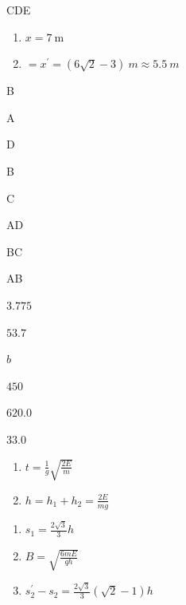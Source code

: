 \item CDE
\item \begin {enumerate} \renewcommand {\labelenumi }{\arabic {enumi}.} \item $x=7 \ \mathrm {m}$ \par \item $=x^{\prime }=(6 \sqrt {2}-3) \ m \approx 5.5 \ m$ \end {enumerate} \par \par 
\item B
\item A
\item D
\item \par 
\item B
\item \par 
\item C
\item \par 
\item AD
\item \par 
\item BC
\item \par 
\item AB
\item \par 
\item $ 3.775 $
\item $ 53.7 $
\item $ b $
\item $ 450 $
\item $ 620.0 $
\item $ 33.0 $
\item \par 
\item \begin {enumerate} \renewcommand {\labelenumi }{\arabic {enumi}.} \item $t=\frac {1}{g} \sqrt {\frac {2 E}{m}}$ \item $h=h_{1}+h_{2}=\frac {2 E}{m g}$ \par \end {enumerate} \par \par 
\item \begin {enumerate} \renewcommand {\labelenumi }{\arabic {enumi}.} \item $s_{1}=\frac {2 \sqrt {3}}{3} h$ \item $B=\sqrt {\frac {6 m E}{q h}}$ \item $s_{2}^{\prime }-s_{2}=\frac {2 \sqrt {3}}{3}(\sqrt {2}-1) h$ \end {enumerate} \par \par 
